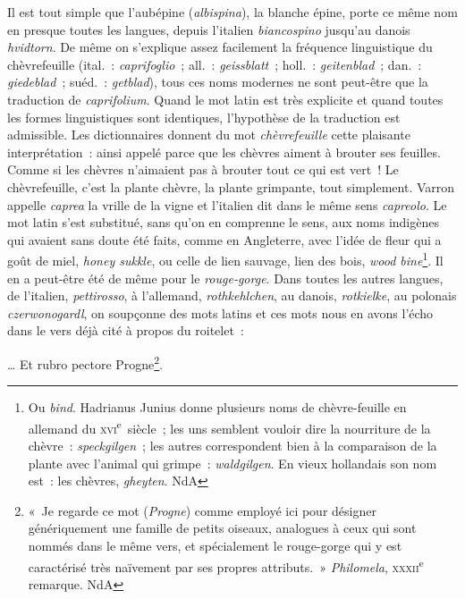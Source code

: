 \documentclass[french,twoside]{book} %
\begin{document}
\noindent Il est tout simple que l’aubépine ({\itshape albispina}), la blanche épine, porte ce même nom en presque toutes les langues, depuis l’italien {\itshape biancospino} jusqu’au danois {\itshape hvidtorn}. De même on s’explique assez facilement la fréquence linguistique du chèvrefeuille (ital. : {\itshape caprifoglio} ; all. : {\itshape geissblatt} ; holl. : {\itshape geitenblad} ; dan. : {\itshape giedeblad} ; suéd. : {\itshape getblad}), tous ces noms modernes ne sont peut-être que la traduction de {\itshape caprifolium}. Quand le mot latin est très explicite et quand toutes les formes linguistiques sont identiques, l’hypothèse de la traduction est admissible. Les dictionnaires donnent du mot {\itshape chèvrefeuille} cette plaisante interprétation : ainsi appelé parce que les chèvres aiment à brouter ses feuilles. Comme si les chèvres n’aimaient pas à brouter tout ce qui est vert ! Le chèvrefeuille, c’est la plante chèvre, la plante grimpante, tout simplement. Varron appelle {\itshape caprea} la vrille de la vigne et l’italien dit dans le même sens {\itshape capreolo}. Le mot latin s’est substitué, sans qu’on en comprenne le sens, aux noms indigènes qui avaient sans doute été faits, comme en Angleterre, avec l’idée de fleur qui a goût de miel, {\itshape honey sukkle}, ou celle de lien sauvage, lien des bois, {\itshape wood bine}\footnote{ Ou {\itshape bind}. Hadrianus Junius donne plusieurs noms de chèvre-feuille en allemand du \textsc{xvi}\textsuperscript{e} siècle ; les uns semblent vouloir dire la nourriture de la chèvre : {\itshape speckgilgen} ; les autres correspondent bien à la comparaison de la plante avec l’animal qui grimpe : {\itshape waldgilgen}. En vieux hollandais son nom est : les chèvres, {\itshape gheyten}. NdA}. Il en a peut-être été de même pour le {\itshape rouge-gorge}. Dans toutes les autres langues, de l’italien, {\itshape pettirosso}, à l’allemand, {\itshape rothkehlchen}, au danois, {\itshape rotkielke}, au polonais {\itshape czerwonogardl}, on soupçonne des mots latins et ces mots nous en avons l’écho dans le vers déjà cité à propos du roitelet :\par

… Et rubro pectore Progne\footnote{« Je regarde ce mot ({\itshape Progne}) comme employé ici pour désigner génériquement une famille de petits oiseaux, analogues à ceux qui sont nommés dans le même vers, et spécialement le rouge-gorge qui y est caractérisé très naïvement par ses propres attributs. » {\itshape Philomela}, \textsc{xxxii}\textsuperscript{e} remarque. NdA}.\\
\end{document}
